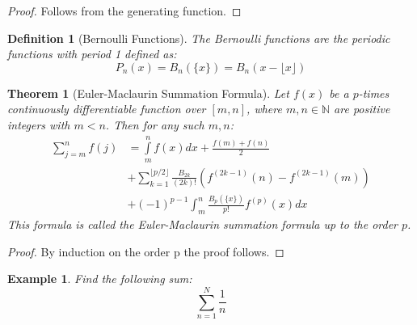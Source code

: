 \documentclass{article}
\newtheorem{thm}{Theorem}
\newtheorem{exmp}{Example}
\newtheorem{defn}{Definition}
\begin{document}
\begin{proof}
Follows from the generating function.
\end{proof}

\smallskip

\begin{defn}[Bernoulli Functions]
The Bernoulli functions are the periodic functions with period 1 defined as:
$$
P_n(x) = B_n(\{x\}) = B_n(x - \lfloor x \rfloor)
$$
\end{defn}

\begin{thm}[Euler-Maclaurin Summation Formula]
Let $f(x)$ be a $p$-times continuously differentiable function over $[m, n]$, where $m, n \in \mathbb{N}$ are positive integers with $m < n$. Then for any such $m, n$:
\begin{align*}
\sum\limits_{j=m}^{n} f(j) &= \int\limits_{m}^{n} f(x) dx + \frac{f(m) + f(n)}{2} \\
&+ \sum_{k=1}^{\lfloor p/2 \rfloor} \frac{B_{2k}}{(2k)!} \left( f^{(2k-1)}(n) - f^{(2k-1)}(m) \right) \\
&+ (-1)^{p-1} \int_{m}^{n} \frac{B_p(\{x\})}{p!} f^{(p)}(x) dx
\end{align*}
This formula is called the Euler-Maclaurin summation formula up to the order $p$.
\end{thm}

\begin{proof}
	By induction on the order p the proof follows.
\end{proof}

\smallskip

\begin{exmp} Find the following sum:
	$$
	\sum_{n=1}^{N} \frac{1}{n}
	$$
\end{exmp}
\end{document}
